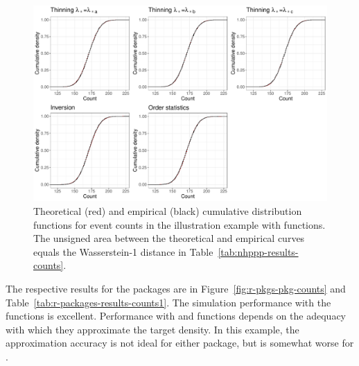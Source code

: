 \documentclass[article]{jss}\usepackage[]{graphicx}\usepackage[]{xcolor}
\makeatletter
\def\maxwidth{ %
  \ifdim\Gin@nat@width>\linewidth
    \linewidth
  \else
    \Gin@nat@width
  \fi
}
\newenvironment{knitrout}{}{} %
\makeatother
\begin{document}
\begin{knitrout}
\color{fgcolor}\begin{figure}
\includegraphics[width=\maxwidth]{figure/ecdf-nhppp-pkg-counts-1} \caption{Theoretical (red) and empirical (black) cumulative distribution functions for event counts in the illustration example with  functions. The unsigned area between the theoretical and empirical curves equals the Wasserstein-1 distance in Table~\ref{tab:nhppp-results-counts}.}\label{fig:ecdf-nhppp-pkg-counts}
\end{figure}

\end{knitrout}





The respective results for the  packages are in Figure~\ref{fig:r-pkgs-pkg-counts} and Table~\ref{tab:r-packages-results-counts1}. The simulation performance with the  functions is excellent. Performance with  and  functions depends on the adequacy with which they approximate the target density. In this example, the approximation accuracy is not ideal for either package, but is somewhat worse for .
\end{document}
